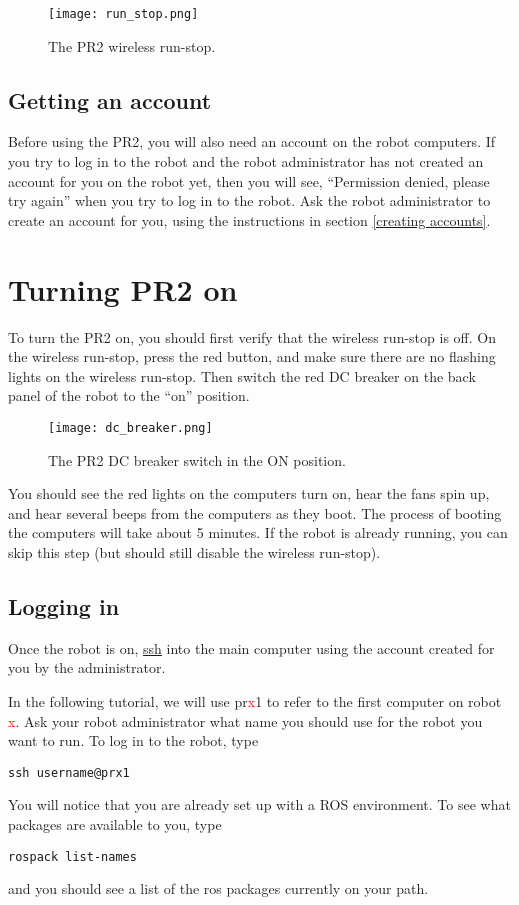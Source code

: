 \begin{figure}[h]
\centering
\texttt{[image: run\_stop.png]}
\caption{The PR2 wireless run-stop.}
\label{fig:runstop}
\end{figure}

\subsection{Getting an account}
Before using the PR2, you will also need an account on the robot computers.  If you try to log in to the robot and the robot administrator has not created an account for you on the robot yet, then you will see, ``Permission denied, please try again'' when you try to log in to the robot. Ask the robot administrator to create an account for you, using the instructions in section \ref{creating accounts}.
\section{Turning PR2 on}
To turn the PR2 on, you should first verify that the wireless run-stop is off. On the wireless run-stop, press the red button, and make sure there are no flashing lights on the wireless run-stop. Then switch the red DC breaker on the back panel of the robot to the ``on'' position.  

\begin{figure}[h]
\centering
\texttt{[image: dc\_breaker.png]}
\caption{The PR2 DC breaker switch in the ON position.}
\label{fig:dc_breaker}
\end{figure}

You should see the red lights on the computers turn on, hear the fans spin up, and hear several beeps from the computers as they boot.  The process of booting the computers will take about 5 minutes.  If the robot is already running, you can skip this step (but should still disable the wireless run-stop).
\subsection{Logging in}
Once the robot is on, \href{http://unixhelp.ed.ac.uk/CGI/man-cgi?ssh}{ssh} into the main computer using the account created for you by the administrator. 

In the following tutorial, we will use pr\textcolor{red}{x}1 to refer to the first computer on robot \textcolor{red}{x}.  Ask your robot  administrator what name you should use for the robot you want to run. To log in to the robot, type
\begin{verbatim}
ssh username@prx1
\end{verbatim}
You will notice that you are already set up with a ROS environment.  To see what packages are available to you, type
\begin{verbatim}
rospack list-names
\end{verbatim}
and you should see a list of the ros packages currently on your path.

